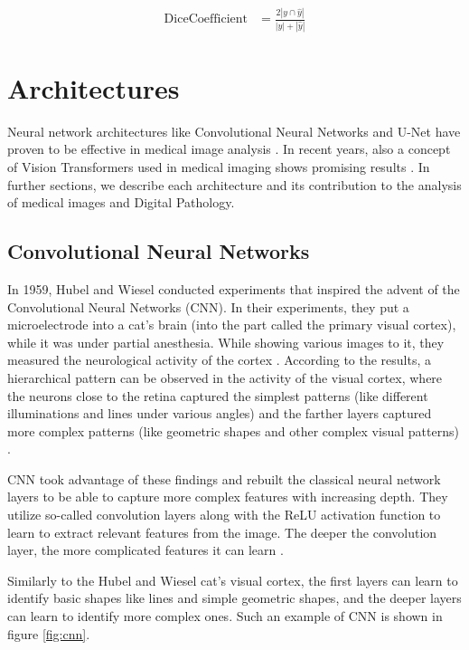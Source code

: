 \begin{align}
\label{eq:dice}
\text{DiceCoefficient} &= \frac{2|y \cap \hat{y}|}{|y| + |\hat{y}|}
\end{align}

\section{Architectures}
Neural network architectures like Convolutional Neural Networks \cite{LeCun2015-2} and U-Net \cite{Ronneberger2015} have proven to be effective in medical image analysis \cite{Santosh2022-2}. In recent years, also a concept of Vision Transformers \cite{Dosovitskiy2020, Hu2023} used in medical imaging shows promising results \cite{Shamshad2023, Hu2023, He2023}. In further sections, we describe each architecture and its contribution to the analysis of medical images and Digital Pathology.

\subsection{Convolutional Neural Networks}
In 1959, Hubel and Wiesel conducted experiments that inspired the advent of the Convolutional Neural Networks (CNN). In their experiments, they put a microelectrode into a cat's brain (into the part called the primary visual cortex), while it was under partial anesthesia. While showing various images to it, they measured the neurological activity of the cortex \cite{Hubel1959}. According to the results, a hierarchical pattern can be observed in the activity of the visual cortex, where the neurons close to the retina captured the simplest patterns (like different illuminations and lines under various angles) and the farther layers captured more complex patterns (like geometric shapes and other complex visual patterns) \cite{Hubel1959}. 

CNN took advantage of these findings and rebuilt the classical neural network layers to be able to capture more complex features with increasing depth. They utilize so-called convolution layers along with the ReLU activation function to learn to extract relevant features from the image. The deeper the convolution layer, the more complicated features it can learn \cite{Santosh2022-2}. 

Similarly to the Hubel and Wiesel cat's visual cortex, the first layers can learn to identify basic shapes like lines and simple geometric shapes, and the deeper layers can learn to identify more complex ones. Such an example of CNN is shown in figure \ref{fig:cnn}.

